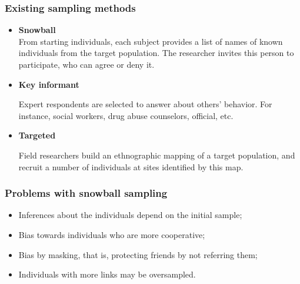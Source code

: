 \documentclass{beamer}
\newcommand{\Space}{\vspace{3ex}}
\begin{document}
\begin{frame}
    
    \frametitle{Existing sampling methods}

    \begin{itemize}
        \justifying

        \item<1> {\bf Snowball} \cite{goodman1961} \\
        
        From starting individuals, each subject provides a list of names of known
        individuals from the target population. The researcher invites this person
        to participate, who can agree or deny it. 
    \end{itemize}

    

    \Space

    \begin{itemize}
      \justifying

      \item<2> {\bf Key informant} \cite{deaux-callaghan1985}
    
      Expert respondents are selected to answer about others' behavior. For instance, social workers, drug abuse counselors, official, etc. 
    \end{itemize}


    \Space

    \begin{itemize}
      \justifying

      \item<3> {\bf Targeted} \cite{watters-biernacki1989}
  
      Field researchers build an ethnographic mapping of a target population,
      and recruit a number of individuals at sites identified by this map.
    \end{itemize}


\end{frame}

\begin{frame}

  \frametitle{Problems with snowball sampling}

  \begin{itemize}
    \justifying
    \item<1> Inferences about the individuals depend on the initial sample;
    \Space
    \item<2> Bias towards individuals who are more cooperative;
    \Space
    \item<3> Bias by masking, that is, protecting friends by not referring them;
    \Space
    \item<4> Individuals with more links may be oversampled.  
  \end{itemize}
  
\end{frame}
\end{document}
